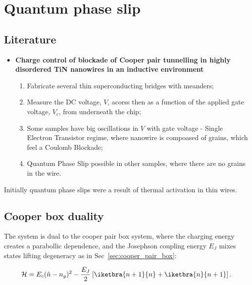 \newpage

\section{Quantum phase slip \cite{mooij2005} \label{sec:qps}}

\subsection{Literature}
\begin{framed}\noindent
  \begin{itemize}
  \item \cite{degraf2018}  \textbf{Charge control of blockade  of Cooper
      pair tunnelling in highly disordered TiN nanowires in an inductive
      environment}
    \begin{enumerate}
    \item Fabricate several thin superconducting bridges with meanders;
    \item Measure the  DC voltage, $ V  $, acorss then as  a function of
      the applied gate voltage, $ V_c $, from underneath the chip;
    \item Some samples have big oscillations  in $ V $ with gate voltage
      - Single  Electron Transistor regime, where  nanowire is compoased
      of grains, which feel a Coulomb Blockade;
    \item Quantum Phase Slip possible  in other samples, where there are
      no grains in the wire.
    \end{enumerate}
  \end{itemize}
\end{framed}

Initially quantum  phase slips  were a result  of thermal  activation in
thin wires.

\subsection{Cooper box duality}
The system  is dual to  the cooper pair  box system, where  the charging
energy  creates  a parabollic  dependence,  and  the Josephson  coupling
energy   $   E_J    $   mixes   states   lifting    degeneracy   as   in
Sec~\ref{sec:cooper_pair_box}:

 \begin{equation}\label{key}
   \mathcal{H} = E_c(\hat{n} - n_g)^2 - \frac{E_J}{2}\left[\iketbra{n+1}{n} + \iketbra{n}{n+1}\right].
 \end{equation}

